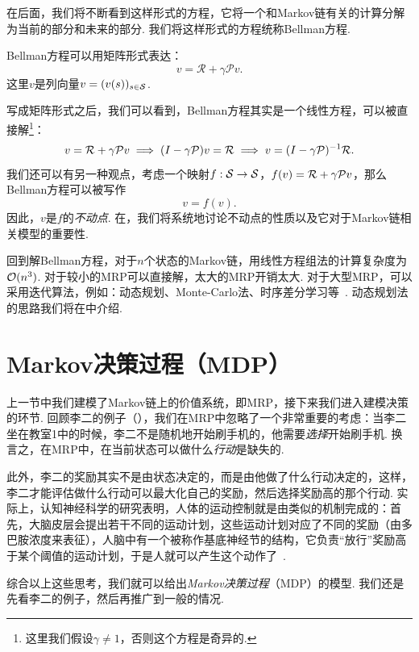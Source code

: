 在后面，我们将不断看到这样形式的方程，它将一个和Markov链有关的计算分解为当前的部分和未来的部分. 我们将这样形式的方程统称Bellman方程. 

Bellman方程可以用矩阵形式表达：
        \[v = \mathcal R + \gamma \mathcal P v.\]
这里$v$是列向量$v=(v(s))_{s\in\mathcal S}$.

写成矩阵形式之后，我们可以看到，Bellman方程其实是一个线性方程，可以被直接解\footnote{这里我们假设$\gamma\neq 1$，否则这个方程是奇异的.}：
\[
    v =\mathcal R + \gamma \mathcal P v \implies (I-\gamma \mathcal P)v = \mathcal R \implies v = (I-\gamma \mathcal P)^{-1} \mathcal R.
\]
我们还可以有另一种观点，考虑一个映射$f:\mathcal S\to \mathcal S$，$f(v)=\mathcal R + \gamma \mathcal P v$，那么Bellman方程可以被写作
\[v=f(v).\]
因此，$v$是$f$的\textit{不动点}. 在，我们将系统地讨论不动点的性质以及它对于Markov链相关模型的重要性.

回到解Bellman方程，对于$n$个状态的Markov链，用线性方程组法的计算复杂度为$\mathcal{O}(n^3)$. 对于较小的MRP可以直接解，太大的MRP开销太大. 对于大型MRP，可以采用迭代算法，例如：动态规划、Monte-Carlo法、时序差分学习等~\cite{watkinsLearningDelayedRewards1989}. 动态规划法的思路我们将在中介绍.

\section{Markov决策过程（MDP）}\label{sec:MDP}

上一节中我们建模了Markov链上的价值系统，即MRP，接下来我们进入建模决策的环节. 回顾李二的例子（），我们在MRP中忽略了一个非常重要的考虑：当李二坐在教室1中的时候，李二不是随机地开始刷手机的，他需要\textit{选择}开始刷手机. 换言之，在MRP中，在当前状态可以做什么\textit{行动}是缺失的. 

此外，李二的奖励其实不是由状态决定的，而是由他做了什么行动决定的，这样，李二才能评估做什么行动可以最大化自己的奖励，然后选择奖励高的那个行动. 实际上，认知神经科学的研究表明，人体的运动控制就是由类似的机制完成的：首先，大脑皮层会提出若干不同的运动计划，这些运动计划对应了不同的奖励（由多巴胺浓度来表征），人脑中有一个被称作基底神经节的结构，它负责“放行”奖励高于某个阈值的运动计划，于是人就可以产生这个动作了~\cite{cisekCorticalMechanismsAction2007,delongPrimateModelsMovement1990}.

综合以上这些思考，我们就可以给出\textit{Markov决策过程}（MDP）的模型. 我们还是先看李二的例子，然后再推广到一般的情况. 

